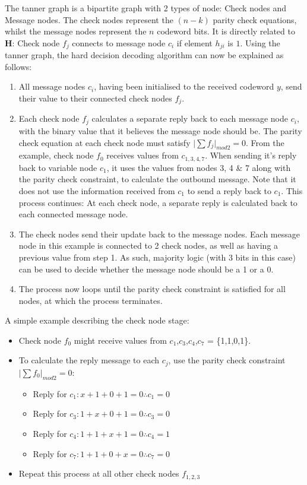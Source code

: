 \documentclass[11pt]{article}
\numberwithin{equation}{subsection}
\begin{document}
The tanner graph is a bipartite graph with 2 types of node: Check nodes and Message nodes. The check nodes represent the $(n-k)$ parity check equations, whilst the message nodes represent the $n$ codeword bits. It is directly related to $\mathbf{H}$: Check node $f_j$ connects to message node $c_i$ if element $h_{ji}$ is $1$. Using the tanner graph, the hard decision decoding algorithm can now be explained as follows:
\begin{enumerate}
\item All message nodes $c_i$, having been initialised to the received codeword $y$, send their value to their connected check nodes $f_j$.
\item Each check node $f_j$ calculates a separate reply back to each message node $c_i$, with the binary value that it believes the message node should be. The parity check equation at each check node must satisfy $\lvert \sum f_j \rvert_{mod2} = 0$. From the example, check node $f_0$ receives values from $c_{1,3,4,7}$. When sending it's reply back to variable node $c_1$, it uses the values from nodes 3, 4 \& 7 along with the parity check constraint, to calculate the outbound message. Note that it does not use the information received from $c_1$ to send a reply back to $c_1$. This process continues: At each check node, a separate reply is calculated back to each connected message node.
\item The check nodes send their update back to the message nodes. Each message node in this example is connected to 2 check nodes, as well as having a previous value from step 1. As such, majority logic (with 3 bits in this case) can be used to decide whether the message node should be a 1 or a 0. 
\item The process now loops until the parity check constraint is satisfied for all nodes, at which the process terminates.
\end{enumerate}

\noindent A simple example describing the check node stage:
\begin{itemize}
\item Check node $f_0$ might receive values from $c_1$,$c_3$,$c_4$,$c_7$ = \{1,1,0,1\}.
\item To calculate the reply message to each $c_j$, use the parity check constraint $\lvert \sum f_0 \rvert_{mod2} = 0$:
\begin{itemize}
\item Reply for $c_1 : x + 1 + 0 + 1 = 0 \therefore c_1 = 0$ 
\item Reply for $c_3 : 1 + x + 0 + 1 = 0 \therefore c_3 = 0$ 
\item Reply for $c_4 : 1 + 1 + x + 1 = 0 \therefore c_4 = 1$ 
\item Reply for $c_7 : 1 + 1 + 0 + x = 0 \therefore c_7 = 0$
\end{itemize}
\item Repeat this process at all other check nodes $f_{1,2,3}$
\end{itemize}
\end{document}

